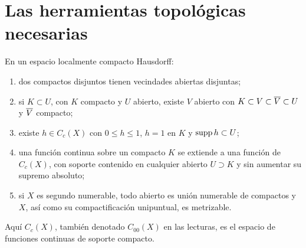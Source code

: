 \section{Las herramientas topológicas necesarias}
\begin{proposicion}\label{v2:topologia-lch}
En un espacio localmente compacto Hausdorff:
\begin{enumerate}
\item dos compactos disjuntos tienen vecindades abiertas disjuntas;
\item si $K\subset U$, con $K$ compacto y $U$ abierto, existe $V$ abierto con $K\subset V\subset\overline{V}\subset U$ y $\overline{V}$ compacto;
\item existe $h\in C_c(X)$ con $0\le h\le1$, $h=1$ en $K$ y $\operatorname{supp} h\subset U$;
\item una función continua sobre un compacto $K$ se extiende a una función de $C_c(X)$, con soporte contenido en cualquier abierto $U\supset K$ y sin aumentar su supremo absoluto;
\item si $X$ es segundo numerable, todo abierto es unión numerable de compactos y $X$, así como su compactificación unipuntual, es metrizable.
\end{enumerate}
Aquí $C_c(X)$, también denotado $C_{00}(X)$ en las lecturas, es el espacio de funciones continuas de soporte compacto.
\end{proposicion}

